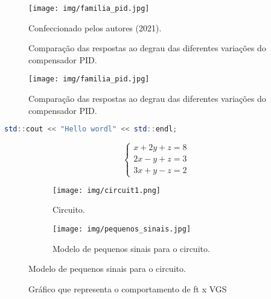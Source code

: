 
\begin{figure}[H]
    \centering
    \texttt{[image: img/familia\_pid.jpg]}
    \caption{Comparação das respostas ao degrau das diferentes variações do compensador PID.}
    \label{fig:familia}
    \begin{flushright}
        Confeccionado pelos autores (2021).
    \end{flushright}
\end{figure} 


\begin{figure}[H]
    \centering
    \texttt{[image: img/familia\_pid.jpg]}
    \caption{Comparação das respostas ao degrau das diferentes variações do compensador PID.}
    \label{fig:familia}
\end{figure} 

\begin{lstlisting}[language=Octave]
std::cout << "Hello wordl" << std::endl;
\end{lstlisting}




\begin{equation*}
     \begin{cases} 
        x+2y+z = 8\\ 
        2x-y+z = 3\\ 
        3x+y-z = 2 
    \end{cases}   
\end{equation*}



\begin{multicols}{2}[]


\end{multicols}


\begin{figure}[H]
    \centering
    \begin{subfigure}[H]{0.4\textwidth}
        \texttt{[image: img/circuit1.png]}
        \caption{Circuito.}
        \label{fig:circuito1}
    \end{subfigure}
     \begin{subfigure}[H]{0.5\textwidth}
        \centering
        \texttt{[image: img/pequenos\_sinais.jpg]}
        \caption{Modelo de pequenos sinais para o circuito.}
        \label{fig:pequenossinais}
     \end{subfigure}
\end{figure}


\begin{figure}[H]
        \centering
        \footnotesize
        
        \normalsize
        \caption{ Gráfico que representa o comportamento de ft x VGS}
        \label{fig:steptemp}
\end{figure}